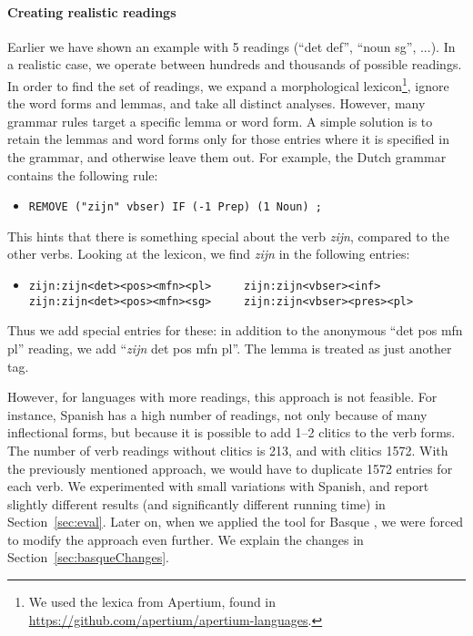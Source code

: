{{\paragraph{Creating realistic readings}
\label{sec:realistic_readings}

Earlier we have shown an example with 5 readings (``det def'', ``noun
sg'', ...). In a realistic case, we operate between hundreds and
thousands of possible readings.  In order to find the set of readings,
we expand a morphological lexicon\footnote{We used the lexica from
 Apertium, found in \url{https://github.com/apertium/apertium-languages}.}, 
ignore the word forms and lemmas, and take all distinct analyses.
However, many grammar rules target a specific lemma or word form.  A
simple solution is to retain the lemmas and word forms only for those
entries where it is specified in the grammar, and otherwise leave them
out. For example, the Dutch grammar contains the following rule:

\begin{itemize}
 \item[] \texttt{REMOVE ("zijn" vbser) IF (-1 Prep) (1 Noun) ;}
\end{itemize}

\noindent This hints that there is something special about the verb
\emph{zijn}, compared to the other verbs. Looking at the lexicon, we
find \emph{zijn} in the following entries:

\begin{itemize}
 \item[] 
\begin{verbatim}
zijn:zijn<det><pos><mfn><pl>     zijn:zijn<vbser><inf>
zijn:zijn<det><pos><mfn><sg>     zijn:zijn<vbser><pres><pl>
\end{verbatim}
\end{itemize}

\noindent Thus we add special entries for these: in addition to the anonymous
``det pos mfn pl'' reading, we add ``\emph{zijn} det pos mfn pl''. 
The lemma is treated as just another tag.

However, for languages with more readings, this approach is not
feasible. For instance, Spanish has a high number of readings, not
only because of many inflectional forms, but because it is possible to
add 1--2 clitics to the verb forms.  The number of verb readings
without clitics is 213, and with clitics 1572.  With the previously
mentioned approach, we would have to duplicate 1572 entries for each
verb. We experimented with small variations with Spanish, and
report slightly different results (and significantly different running
time) in Section~\ref{sec:eval}. Later on, when we applied the tool for Basque
\cite{listenmaa2017basque}, we were forced to modify the approach even
further. We explain the changes in Section~\ref{sec:basqueChanges}.

}}
